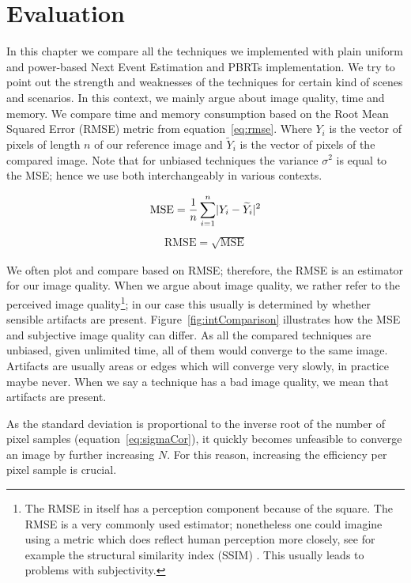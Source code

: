 \chapter{Evaluation}
\label{ch:Evaluation}
In this chapter we compare all the techniques we implemented with plain uniform and power-based Next Event Estimation and PBRTs implementation. We try to point out the strength and weaknesses of the techniques for certain kind of scenes and scenarios. In this context, we mainly argue about image quality, time and memory. We compare time and memory consumption based on the Root Mean Squared Error (RMSE) metric from equation~\ref{eq:rmse}. Where $Y_i$ is the vector of pixels of length $n$ of our reference image and $\widetilde{Y}_i$ is the vector of pixels of the compared image. Note that for unbiased techniques the variance $\sigma^2$ is equal to the MSE; hence we use both interchangeably in various contexts. 

\begin{align}\label{eq:mse}
\text{MSE} = \frac{1}{n}\sum_{i=1}^{n}\lvert Y_i - \widetilde{Y}_i\rvert^2
\end{align}
\begin{align}\label{eq:rmse}
\text{RMSE} = \sqrt{\text{MSE}}
\end{align}


We often plot and compare based on RMSE; therefore, the RMSE is an estimator for our image quality. When we argue about image quality, we rather refer to the perceived image quality\footnote{The RMSE in itself has a perception component because of the square. The RMSE is a very commonly used estimator; nonetheless one could imagine using a metric which does reflect human perception more closely, see for example the structural similarity index (SSIM) \parencite{DBLP:journals/tip/WangBSS04}. This usually leads to problems with subjectivity.}; in our case this usually is determined by whether sensible artifacts are present. Figure~\ref{fig:intComparison} illustrates how the MSE and subjective image quality can differ. As all the compared techniques are unbiased, given unlimited time, all of them would converge to the same image. Artifacts are usually areas or edges which will converge very slowly, in practice maybe never. When we say a technique has a bad image quality, we mean that artifacts are present. 

As the standard deviation is proportional to the inverse root of the number of pixel samples (equation~\ref{eq:sigmaCor}), it quickly becomes unfeasible to converge an image by further increasing $N$. For this reason, increasing the efficiency per pixel sample is crucial.

